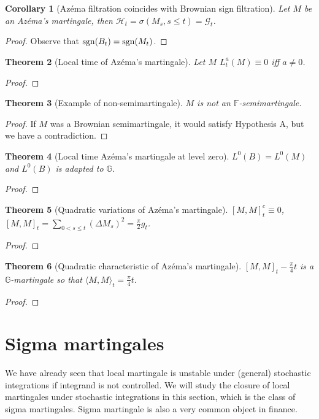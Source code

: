 \documentclass[openany,oneside]{book}
\newtheorem{thm}{Theorem}[section]
\newtheorem{cor}[thm]{Corollary}
\theoremstyle{definition}
\theoremstyle{remark}
\begin{document}
\begin{cor}[Az\'ema filtration coincides with Brownian sign filtration]
Let $M$ be an Az\'ema's martingale, then $\mathcal{H}_t = \sigma(M_s, s\le t) =\mathcal{G}_t$.
\end{cor}
\begin{proof}
Observe that ${\rm sgn}(B_t) = {\rm sgn}(M_t)$.
\end{proof}

\begin{thm}[Local time of Az\'ema's martingale]
Let $M$ $L^a_t(M)\equiv 0$ iff $a\ne 0$.
\end{thm}
\begin{proof}

\end{proof}


\begin{thm}[Example of non-semimartingale]
$M$ is not an $\mathbb{F}$-semimartingale.
\end{thm}
\begin{proof}
If $M$ was a Brownian semimartingale, it would satisfy Hypothesis A, but we have a contradiction.
\end{proof}


\begin{thm}[Local time Az\'ema's martingale at level zero]
$L^0(B) = L^0(M)$ and $L^0(B)$ is adapted to $\mathbb{G}$.
\end{thm}
\begin{proof}

\end{proof}

\begin{thm}[Quadratic variations of Az\'ema's martingale]
$[M,M]^c_t \equiv 0$, $[M,M]_t = \sum_{0<s\le t}(\Delta M_s)^2 = \frac{\pi}{2} g_t$.
\end{thm}
\begin{proof}

\end{proof}

\begin{thm}[Quadratic characteristic of Az\'ema's martingale]
$[M,M]_t - \frac{\pi}{4}t$ is a $\mathbb{G}$-martingale so that $\langle M,M\rangle_t = \frac{\pi}{4}t$.
\end{thm}
\begin{proof}

\end{proof}


\section{Sigma martingales}
We have already seen that local martingale is unstable under (general) stochastic integrations if integrand is not controlled. We will study the closure of local martingales under stochastic integrations in this section, which is the class of sigma martingales. Sigma martingale is also a very common object in finance. 
\end{document}
